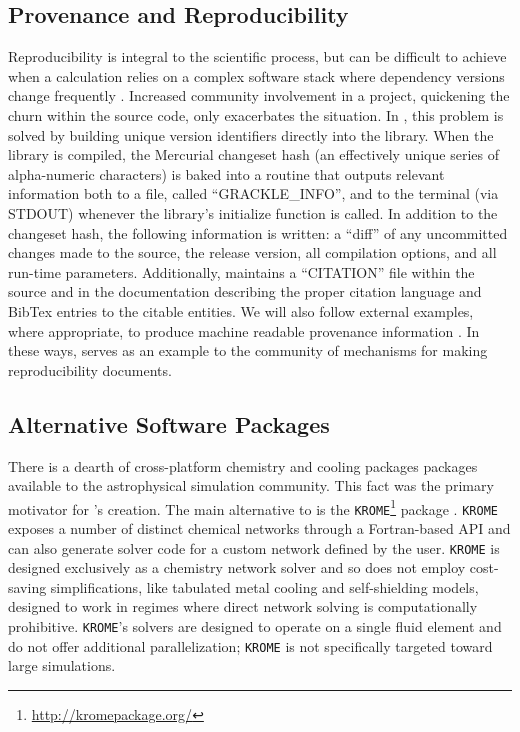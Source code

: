 \subsection{Provenance and Reproducibility}

Reproducibility is integral to the scientific process, but can be
difficult to achieve when a calculation relies on a complex software
stack where dependency versions change frequently
\citep{2014arXiv1412.5557J, 2016arXiv161009958L}.  Increased
community involvement in a project, quickening the churn within the
source code, only exacerbates the situation.  In \grackle{}, this
problem is solved by building unique version identifiers directly
into the library.  When the library is compiled, the Mercurial
changeset hash (an effectively unique series of alpha-numeric
characters) is baked into a routine that outputs relevant information
both to a file, called ``GRACKLE\_INFO'', and to the terminal (via
STDOUT) whenever the library's initialize function is called.  In
addition to the changeset hash, the following information is written:
a ``diff'' of any uncommitted changes made to the source, the release
version, all compilation options, and all run-time parameters.
Additionally, \grackle{} maintains a ``CITATION'' file within the
source and in the documentation describing the proper citation
language and BibTex entries to the citable entities.  We will also
follow external examples, where appropriate, to produce machine
readable provenance information \citep[e.g.,][]{force11,
  Fenner097196}.  In these ways, \grackle{} serves as an example to
the community of mechanisms for making reproducibility documents.

\subsection{Alternative Software Packages}

There is a dearth of cross-platform chemistry and cooling packages 
packages available to the astrophysical simulation community.  This
fact was the primary motivator for \grackle{}'s creation.  The main
alternative to \grackle{} is the 
\texttt{KROME}\footnote{\url{http://kromepackage.org/}} package
\citep{2014MNRAS.439.2386G}.  \texttt{KROME} exposes a number of
distinct chemical networks through a Fortran-based API and can also
generate solver code for a custom network defined by the user.
\texttt{KROME} is designed exclusively as a chemistry network solver
and so does not employ cost-saving simplifications, like tabulated
metal cooling and self-shielding models, designed to work in regimes
where direct network solving is computationally prohibitive.
\texttt{KROME}'s solvers are designed to operate on a single fluid
element and do not offer additional parallelization; \texttt{KROME} is
not specifically targeted toward large simulations.

